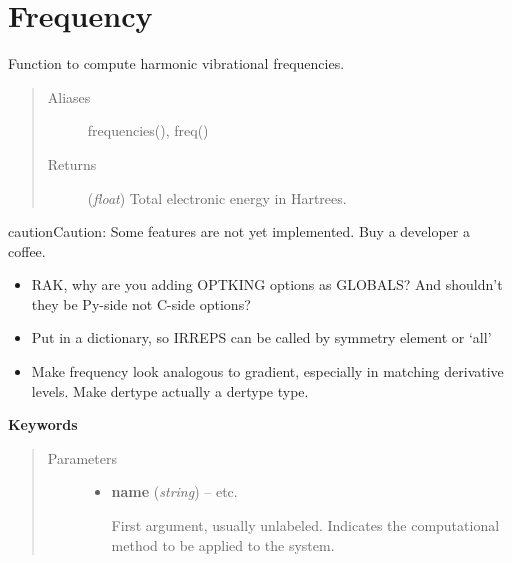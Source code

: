 \documentclass[letterpaper,10pt,english]{sphinxmanual}
\begin{document}
\chapter{Frequency}
\label{index:frequency}

\begin{fulllineitems}
\label{index:driver.frequency}
Function to compute harmonic vibrational frequencies.
\begin{quote}\begin{description}
\item[{Aliases }] \leavevmode
frequencies(), freq()

\item[{Returns}] \leavevmode
(\emph{float}) Total electronic energy in Hartrees.

\end{description}\end{quote}

\begin{notice}{caution}{Caution:}
Some features are not yet implemented. Buy a developer a coffee.
\begin{itemize}
\item {} 
RAK, why are you adding OPTKING options as GLOBALS? And shouldn't they be Py-side not C-side options?

\item {} 
Put in a dictionary, so IRREPS can be called by symmetry element or `all'

\item {} 
Make frequency look analogous to gradient, especially in matching derivative levels. Make dertype actually a dertype type.

\end{itemize}
\end{notice}

\textbf{Keywords}
\begin{quote}\begin{description}
\item[{Parameters}] \leavevmode\begin{itemize}
\item {} 
\textbf{name} (\emph{string}) -- 
 \textbar{}\textbar{}  \textbar{}\textbar{}  \textbar{}\textbar{} etc.

First argument, usually unlabeled. Indicates the computational method
to be applied to the system.



\end{itemize}
\end{description}
\end{quote}
\end{fulllineitems}
\end{document}
